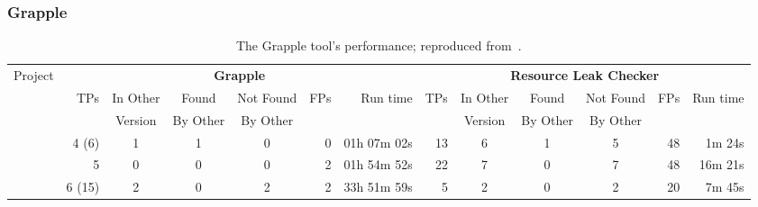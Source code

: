 
\subsubsection{Grapple}
\label{sec:grapple}

\newcommand{\grappletableproject}[1]{\textbf{\smaller{#1}}}

\begin{table*}
  \caption{The Grapple tool's performance; reproduced from~\cite{zuo2019grapple}.
  }
  \label{tab:grapple}
  \posttablecaption
  
  \begin{tabularx}{\linewidth}{@{}X||rcccrr||rcccrr@{}}
    \multirow{3}{*}{Project}             & \multicolumn{6}{c}{\textbf{Grapple}} & \multicolumn{6}{c}{\textbf{Resource Leak Checker}} \\
                                         &  \multirow{2}{*}{TPs}   & In Other & Found & Not Found  &  \multirow{2}{*}{FPs}  &     \multirow{2}{*}{Run time}    &  \multirow{2}{*}{TPs}  & In Other & Found & Not Found  &    \multirow{2}{*}{FPs}  & \multirow{2}{*}{Run time}  \\
                                         &                         & Version  & By Other & By Other &      &                 &          & Version  & By Other & By Other &      &                 \\
    \hline
    \grappletableproject{ZooKeeper}      & 4 (6)  &   1     &   1   &    0       &   0   &    01h 07m 02s  &  13   &    6    &  1    &     5      &     48  &  1m 24s  \\
    \grappletableproject{HDFS}           &   5    &   0     &   0   &    0       &   2   &    01h 54m 52s  &  22   &    7    &  0    &     7      &     48  &  16m 21s \\
    \grappletableproject{HBase}          & 6 (15) &   2     &   0   &    2       &   2   &    33h 51m 59s  &   5   &    2    &  0    &     2      &     20  &  7m 45s  \\
  \end{tabularx}
\end{table*}

